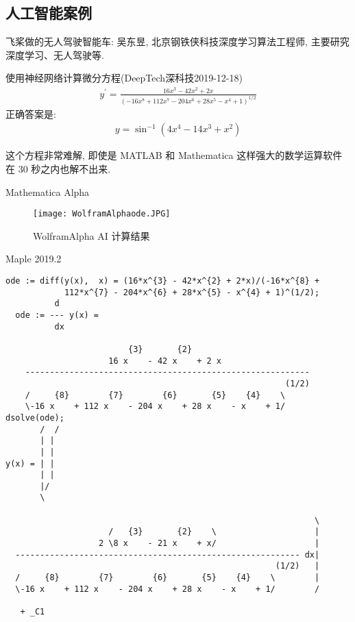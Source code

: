 \subsection{人工智能案例}
\begin{example}
  飞桨做的无人驾驶智能车: 吴东昱, 北京钢铁侠科技深度学习算法工程师, 主要研究深度学习、无人驾驶等.
\end{example}
\begin{example}
使用神经网络计算微分方程(DeepTech深科技2019-12-18)
\begin{align}
y^{\prime}=\frac{16 x^{3}-42 x^{2}+2 x}{\left(-16 x^{8}+112 x^{7}-204 x^{6}+28 x^{5}-x^{4}+1\right)^{1 / 2}}
\end{align}
正确答案是:
\begin{align}
y=\sin ^{-1}\left(4 x^{4}-14 x^{3}+x^{2}\right)
\end{align}
\end{example}
这个方程非常难解, 即使是 MATLAB 和 Mathematica 这样强大的数学运算软件在 30 秒之内也解不出来.

Mathematica  Alpha
\begin{figure}[H]
\centering
\texttt{[image: WolframAlphaode.JPG]}
\caption{WolframAlpha AI 计算结果}
\label{WolframAlphaodefig11}
\end{figure}

Maple 2019.2
\begin{Verbatim}
ode := diff(y(x),  x) = (16*x^{3} - 42*x^{2} + 2*x)/(-16*x^{8} +
            112*x^{7} - 204*x^{6} + 28*x^{5} - x^{4} + 1)^(1/2);
          d
  ode := --- y(x) =
          dx

                         {3}       {2}
                     16 x    - 42 x    + 2 x
    ----------------------------------------------------------
                                                         (1/2)
    /     {8}        {7}        {6}       {5}    {4}    \
    \-16 x    + 112 x    - 204 x    + 28 x    - x    + 1/
dsolve(ode);
       /  /
       | |
       | |
y(x) = | |
       | |
       |/
       \

                                                               \
                     /   {3}       {2}    \                    |
                   2 \8 x    - 21 x    + x/                    |
  ---------------------------------------------------------- dx|
                                                       (1/2)   |
  /     {8}        {7}        {6}       {5}    {4}    \        |
  \-16 x    + 112 x    - 204 x    + 28 x    - x    + 1/        /

   + _C1
\end{Verbatim}

